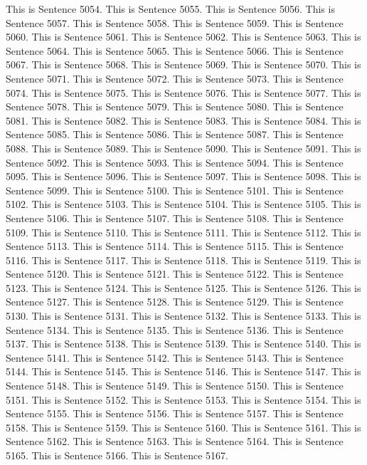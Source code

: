 \documentclass{article}
\begin{document}
This is Sentence 5054.
This is Sentence 5055.
This is Sentence 5056.
This is Sentence 5057.
This is Sentence 5058.
This is Sentence 5059.
This is Sentence 5060.
This is Sentence 5061.
This is Sentence 5062.
This is Sentence 5063.
This is Sentence 5064.
This is Sentence 5065.
This is Sentence 5066.
This is Sentence 5067.
This is Sentence 5068.
This is Sentence 5069.
This is Sentence 5070.
This is Sentence 5071.
This is Sentence 5072.
This is Sentence 5073.
This is Sentence 5074.
This is Sentence 5075.
This is Sentence 5076.
This is Sentence 5077.
This is Sentence 5078.
This is Sentence 5079.
This is Sentence 5080.
This is Sentence 5081.
This is Sentence 5082.
This is Sentence 5083.
This is Sentence 5084.
This is Sentence 5085.
This is Sentence 5086.
This is Sentence 5087.
This is Sentence 5088.
This is Sentence 5089.
This is Sentence 5090.
This is Sentence 5091.
This is Sentence 5092.
This is Sentence 5093.
This is Sentence 5094.
This is Sentence 5095.
This is Sentence 5096.
This is Sentence 5097.
This is Sentence 5098.
This is Sentence 5099.
This is Sentence 5100.
This is Sentence 5101.
This is Sentence 5102.
This is Sentence 5103.
This is Sentence 5104.
This is Sentence 5105.
This is Sentence 5106.
This is Sentence 5107.
This is Sentence 5108.
This is Sentence 5109.
This is Sentence 5110.
This is Sentence 5111.
This is Sentence 5112.
This is Sentence 5113.
This is Sentence 5114.
This is Sentence 5115.
This is Sentence 5116.
This is Sentence 5117.
This is Sentence 5118.
This is Sentence 5119.
This is Sentence 5120.
This is Sentence 5121.
This is Sentence 5122.
This is Sentence 5123.
This is Sentence 5124.
This is Sentence 5125.
This is Sentence 5126.
This is Sentence 5127.
This is Sentence 5128.
This is Sentence 5129.
This is Sentence 5130.
This is Sentence 5131.
This is Sentence 5132.
This is Sentence 5133.
This is Sentence 5134.
This is Sentence 5135.
This is Sentence 5136.
This is Sentence 5137.
This is Sentence 5138.
This is Sentence 5139.
This is Sentence 5140.
This is Sentence 5141.
This is Sentence 5142.
This is Sentence 5143.
This is Sentence 5144.
This is Sentence 5145.
This is Sentence 5146.
This is Sentence 5147.
This is Sentence 5148.
This is Sentence 5149.
This is Sentence 5150.
This is Sentence 5151.
This is Sentence 5152.
This is Sentence 5153.
This is Sentence 5154.
This is Sentence 5155.
This is Sentence 5156.
This is Sentence 5157.
This is Sentence 5158.
This is Sentence 5159.
This is Sentence 5160.
This is Sentence 5161.
This is Sentence 5162.
This is Sentence 5163.
This is Sentence 5164.
This is Sentence 5165.
This is Sentence 5166.
This is Sentence 5167.
\end{document}
